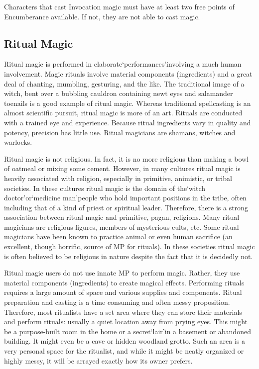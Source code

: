 \documentclass[twoside]{book}
\begin{document}
    {  
    Characters that cast Invocation magic must have at least two free points of Encumberance available. If not, they are not able to cast magic.
    }
  
    

\subsection{Ritual Magic}
    
    {  
    Ritual magic is performed in elaborate`performances'involving a much human involvement. Magic rituals involve material components (ingredients) and a great deal of chanting, mumbling, gesturing, and the like. The traditional image of a witch, bent over a bubbling cauldron containing newt eyes and salamander toenails is a good example of ritual magic. Whereas traditional spellcasting is an almost scientific pursuit, ritual magic is more of an art. Rituals are conducted with a trained eye and experience. Because ritual ingredients vary in quality and potency, precision has little use. Ritual magicians are shamans, witches and warlocks.
    }
  
    {  
    Ritual magic is not religious. In fact, it is no more religious than making a bowl of oatmeal or mixing some cement. However, in many cultures ritual magic is heavily associated with religion, especially in primitive, animistic, or tribal societies. In these cultures ritual magic is the domain of the`witch doctor'or`medicine man'people who hold important positions in the tribe, often including that of a kind of priest or spiritual leader. Therefore, there is a strong association between ritual magic and primitive, pagan, religions. Many ritual magicians are religious figures, members of mysterious cults, etc. Some ritual magicians have been known to practice animal or even human sacrifice (an excellent, though horrific, source of MP for rituals). In these societies ritual magic is often believed to be religious in nature despite the fact that it is decidedly not.
    }
  
    {  
    Ritual magic users do not use innate MP to perform magic. Rather, they use material components (ingredients) to create magical effects. Performing rituals requires a large amount of space and various supplies and components. Ritual preparation and casting is a time consuming and often messy proposition. Therefore, most ritualists have a set area where they can store their materials and perform rituals: usually a quiet location away from prying eyes. This might be a purpose-built room in the home or a secret`lair'in a basement or abandoned building. It might even be a cave or hidden woodland grotto. Such an area is a very personal space for the ritualist, and while it might be neatly organized or highly messy, it will be arrayed exactly how its owner prefers.
    }
  
\end{document}
